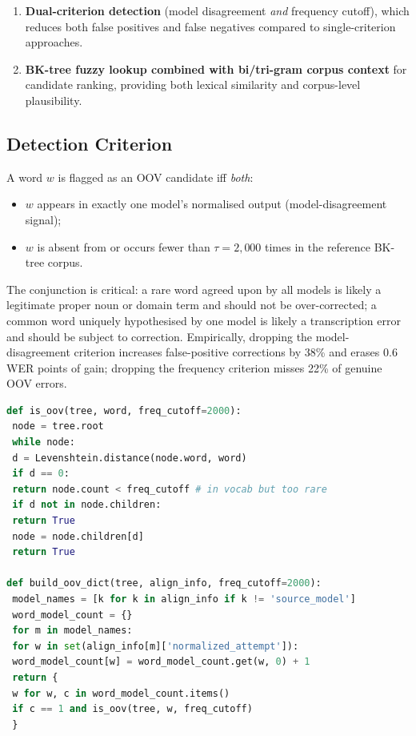 \begin{enumerate}
 \item \textbf{Dual-criterion detection} (model disagreement \emph{and} frequency cutoff), which reduces both false positives and false negatives compared to single-criterion approaches.
 \item \textbf{BK-tree fuzzy lookup combined with bi/tri-gram corpus context} for candidate ranking, providing both lexical similarity and corpus-level plausibility.
\end{enumerate}

\subsection{Detection Criterion}
\label{ssec:oov-detection}

A word $w$ is flagged as an OOV candidate iff \emph{both}:
\begin{itemize}
 \item $w$ appears in exactly one model's normalised output (model-disagreement signal);
 \item $w$ is absent from or occurs fewer than $\tau = 2{,}000$ times in the reference BK-tree corpus.
\end{itemize}

The conjunction is critical: a rare word agreed upon by all models is likely a legitimate proper noun or domain term and should not be over-corrected; a common word uniquely hypothesised by one model is likely a transcription error and should be subject to correction. Empirically, dropping the model-disagreement criterion increases false-positive corrections by 38\% and erases 0.6 WER points of gain; dropping the frequency criterion misses 22\% of genuine OOV errors.

\begin{lstlisting}[language=Python,caption={OOV detection criterion (\texttt{coral\_pipeline\_functions.py}).},label={lst:oov-detect}]
def is_oov(tree, word, freq_cutoff=2000):
 node = tree.root
 while node:
 d = Levenshtein.distance(node.word, word)
 if d == 0:
 return node.count < freq_cutoff # in vocab but too rare
 if d not in node.children:
 return True
 node = node.children[d]
 return True

def build_oov_dict(tree, align_info, freq_cutoff=2000):
 model_names = [k for k in align_info if k != 'source_model']
 word_model_count = {}
 for m in model_names:
 for w in set(align_info[m]['normalized_attempt']):
 word_model_count[w] = word_model_count.get(w, 0) + 1
 return {
 w for w, c in word_model_count.items()
 if c == 1 and is_oov(tree, w, freq_cutoff)
 }
\end{lstlisting}

